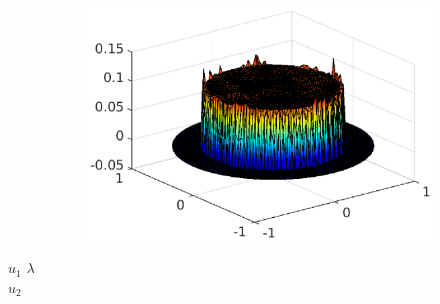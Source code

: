 \begin{frame}
\begin{figure}
\begin{subfigure}[normal]{0.44\textwidth}
\end{subfigure}
\qquad
\begin{subfigure}[normal]{0.44\textwidth}
\includegraphics[width=\textwidth]{fig_article_chap_1/fig_lambda_cv.eps}     
\end{subfigure}
\end{figure}
\vspace*{-4.4cm}\hspace*{1.5 cm}$u_1$ \hspace{8 cm} $\lambda$\\
\vspace*{0.7cm}\hspace*{1.5 cm}$u_2$\\
\end{frame}
%
